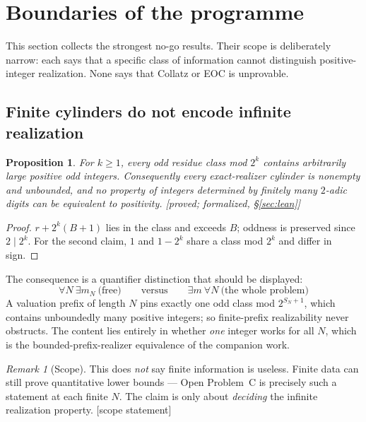 \documentclass[11pt]{article}
\theoremstyle{plain}
\newtheorem{proposition}[theorem]{Proposition}
\theoremstyle{definition}
\theoremstyle{remark}
\newtheorem{remark}[theorem]{Remark}
\newcommand{\status}[1]{\textsf{\footnotesize[#1]}}
\begin{document}
\section{Boundaries of the programme}\label{sec:boundaries}

This section collects the strongest no-go results. Their scope is deliberately narrow: each says
that a specific class of information cannot distinguish positive-integer realization. None says
that Collatz or EOC is unprovable.

\subsection{Finite cylinders do not encode infinite realization}\label{sec:cylinder}

\begin{proposition}\label{prop:cylinder}
For $k\ge1$, every odd residue class mod $2^k$ contains arbitrarily large positive odd integers.
Consequently every exact-realizer cylinder is nonempty and unbounded, and no property of integers
determined by finitely many $2$-adic digits can be equivalent to positivity.
\status{proved; formalized, \S\ref{sec:lean}}
\end{proposition}

\begin{proof}
$r+2^k(B+1)$ lies in the class and exceeds $B$; oddness is preserved since $2\mid 2^k$. For the
second claim, $1$ and $1-2^k$ share a class mod $2^k$ and differ in sign.
\end{proof}

The consequence is a quantifier distinction that should be displayed:
\[
\boxed{\ \forall N\ \exists m_N\ \text{(free)}\qquad\text{versus}\qquad \exists m\ \forall N\ \text{(the whole problem)}\ }
\]
A valuation prefix of length $N$ pins exactly one odd class mod $2^{S_N+1}$, which contains
unboundedly many positive integers; so finite-prefix realizability never obstructs. The content
lies entirely in whether \emph{one} integer works for all $N$, which is the bounded-prefix-realizer
equivalence of the companion work.

\begin{remark}[Scope]
This does \emph{not} say finite information is useless. Finite data can still prove quantitative
lower bounds --- Open Problem~C is precisely such a statement at each finite $N$. The claim is only
about \emph{deciding} the infinite realization property. \status{scope statement}
\end{remark}
\end{document}

